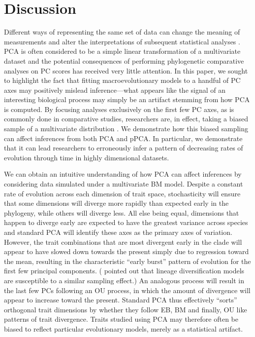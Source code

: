 \documentclass[a4paper,11pt]{article}
\begin{document}
\section{Discussion}
Different ways of representing the same set of data can change the meaning of measurements and alter the interpretations of subsequent statistical analyses \citep{Houle2011}. PCA is often considered to be a simple linear transformation of a multivariate dataset and the potential consequences of performing phylogenetic comparative analyses on PC scores has received very little attention. In this paper, we sought to highlight the fact that fitting macroevolutionary models to a handful of PC axes may positively mislead inference---what appears like the signal of an interesting biological process may simply be an artifact stemming from how PCA is computed. By focusing analyses exclusively on the first few PC axes, as is commonly done in comparative studies, researchers are, in effect, taking a biased sample of a multivariate distribution \citep{Mitteroecker}. We demonstrate how this biased sampling can affect inferences from both PCA and pPCA. In particular, we demonstrate that it can lead researchers to erroneously infer a pattern of decreasing rates of evolution through time in highly dimensional datasets.

We can obtain an intuitive understanding of how PCA can affect inferences by considering data simulated under a multivariate BM model. Despite a constant rate of evolution across each dimension of trait space, stochasticity will ensure that some dimensions will diverge more rapidly than expected early in the phylogeny, while others will diverge less. All else being equal, dimensions that happen to diverge early are expected to have the greatest variance across species and standard PCA will identify these axes as the primary axes of variation. However, the trait combinations that are most divergent early in the clade will appear to have slowed down towards the present simply due to regression toward the mean, resulting in the characteristic ``early burst'' pattern of evolution for the first few principal components. (\citealt{Pennell2012} pointed out that lineage diversification models are susceptible to a similar sampling effect.) An analogous process will result in the last few PCs following an OU process, in which the amount of divergence will appear to increase toward the present. Standard PCA thus effectively ``sorts'' orthogonal trait dimensions by whether they follow EB, BM and finally, OU like patterns of trait divergence. Traits studied using PCA may therefore often be biased to reflect particular evolutionary models, merely as a statistical artifact.
\end{document}
